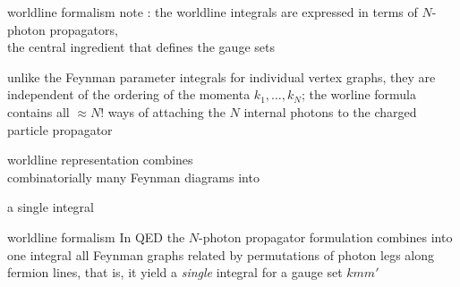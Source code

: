 \begin{frame}{worldline formalism}
note : the worldline integrals are expressed
in terms of $N$-photon propagators, \\
the central ingredient that defines
the \textcolor{red!80!black}{gauge sets}

\bigskip
unlike the Feynman parameter integrals for individual vertex graphs, they are
independent of the ordering of the momenta $k_1,\ldots,k_N$; the worline formula
contains all $\approx N!$ ways of attaching the $N$ internal
photons to the charged particle propagator

\bigskip
worldline representation combines
\\
\textcolor{green!80!black}{combinatorially many} Feynman diagrams into

\medskip\hfill
a \textcolor{green!80!black}{{\Huge single}} integral

\end{frame}

\begin{frame}{worldline formalism}
In QED the $N$-photon propagator formulation combines into one integral
all Feynman graphs related by permutations of photon legs along fermion
lines, that is, it yield a \emph{single} integral for a gauge set
$kmm'$
\end{frame}

